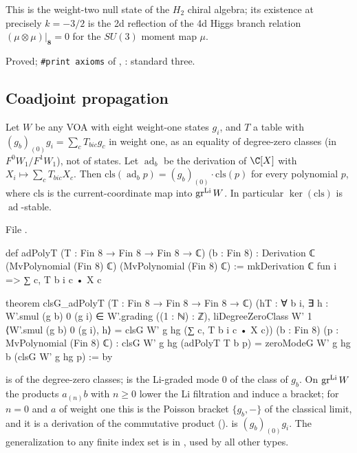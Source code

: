 \begin{physics}
This is the weight-two null state of the $H_2$ chiral algebra; its existence at precisely $k=-3/2$ is the
2d reflection of the 4d Higgs branch relation $(\mu\otimes\mu)|_{\mathbf 8}=0$ for the $SU(3)$ moment map $\mu$.
\end{physics}

\begin{status}
Proved; \texttt{\#print axioms} of , : standard three.
\end{status}

\subsection{Coadjoint propagation}

\begin{theorem}\label{l24:thm:adprop}
Let $W$ be any VOA with eight weight-one states $g_i$, and $T$ a table with $(g_b)_{(0)}g_i=\sum_cT_{bic}g_c$ in
weight one, as an equality of degree-zero classes (in $F^0W_1/F^1W_1$), not of states. Let $\operatorname{ad}_b$ be the derivation of $\C[X]$ with
$X_i\mapsto\sum_cT_{bic}X_c$. Then $\mathrm{cls}(\operatorname{ad}_bp)=(g_b)_{(0)}\cdot\mathrm{cls}(p)$ for every
polynomial $p$, where $\mathrm{cls}$ is the current-coordinate map into $\operatorname{gr}^{\mathrm{Li}} W$. In particular
$\ker(\mathrm{cls})$ is $\operatorname{ad}$-stable.
\end{theorem}
\noindent File .
\begin{leancode}
def adPolyT (T : Fin 8 → Fin 8 → Fin 8 → ℂ) (b : Fin 8) :
    Derivation ℂ (MvPolynomial (Fin 8) ℂ) (MvPolynomial (Fin 8) ℂ) :=
  mkDerivation ℂ fun i => ∑ c, T b i c • X c

theorem clsG_adPolyT (T : Fin 8 → Fin 8 → Fin 8 → ℂ)
    (hT : ∀ b i, ∃ h : W'.smul (g b) 0 (g i) ∈ W'.grading ((1 : ℕ) : ℤ),
      liDegreeZeroClass W' 1 ⟨W'.smul (g b) 0 (g i), h⟩ = clsG W' g hg (∑ c, T b i c • X c))
    (b : Fin 8) (p : MvPolynomial (Fin 8) ℂ) :
    clsG W' g hg (adPolyT T b p) = zeroModeG W' g hg b (clsG W' g hg p) := by
\end{leancode}

\begin{dictionary}
 is  of the degree-zero classes;  is the Li-graded mode
$0$ of the class of $g_b$. On $\operatorname{gr}^{\mathrm{Li}} W$ the products $a_{(n)}b$ with $n\ge0$ lower the Li filtration and induce a
bracket; for $n=0$ and $a$ of weight one this is the Poisson bracket $\{g_b,-\}$ of the classical limit, and it is a
derivation of the commutative product ().  is $(g_b)_{(0)}g_i$. The
generalization to any finite index set is  in
, used by all other types.
\end{dictionary}

